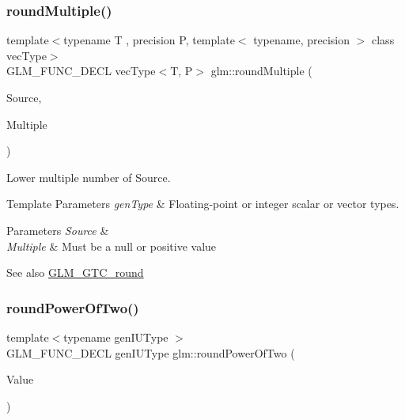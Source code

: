 \subsubsection{\texorpdfstring{round\+Multiple()}{roundMultiple()}\hspace{0.1cm}{\footnotesize\ttfamily [2/2]}}
{\footnotesize\ttfamily template$<$typename T , precision P, template$<$ typename, precision $>$ class vec\+Type$>$ \\
G\+L\+M\+\_\+\+F\+U\+N\+C\+\_\+\+D\+E\+CL vec\+Type$<$T, P$>$ glm\+::round\+Multiple (\begin{DoxyParamCaption}\item[{vec\+Type$<$ T, P $>$ const \&}]{Source,  }\item[{vec\+Type$<$ T, P $>$ const \&}]{Multiple }\end{DoxyParamCaption})}

Lower multiple number of Source.


\begin{DoxyTemplParams}{Template Parameters}
{\em gen\+Type} & Floating-\/point or integer scalar or vector types. \\
\hline
\end{DoxyTemplParams}

\begin{DoxyParams}{Parameters}
{\em Source} & \\
\hline
{\em Multiple} & Must be a null or positive value\\
\hline
\end{DoxyParams}
\begin{DoxySeeAlso}{See also}
\hyperlink{group__gtc__round}{G\+L\+M\+\_\+\+G\+T\+C\+\_\+round} 
\end{DoxySeeAlso}
\mbox{\label{group__gtc__round_ga6d24a9e3abe3e6a908661b43acb8efe0}} 
\subsubsection{\texorpdfstring{round\+Power\+Of\+Two()}{roundPowerOfTwo()}\hspace{0.1cm}{\footnotesize\ttfamily [1/2]}}
{\footnotesize\ttfamily template$<$typename gen\+I\+U\+Type $>$ \\
G\+L\+M\+\_\+\+F\+U\+N\+C\+\_\+\+D\+E\+CL gen\+I\+U\+Type glm\+::round\+Power\+Of\+Two (\begin{DoxyParamCaption}\item[{gen\+I\+U\+Type}]{Value }\end{DoxyParamCaption})}

